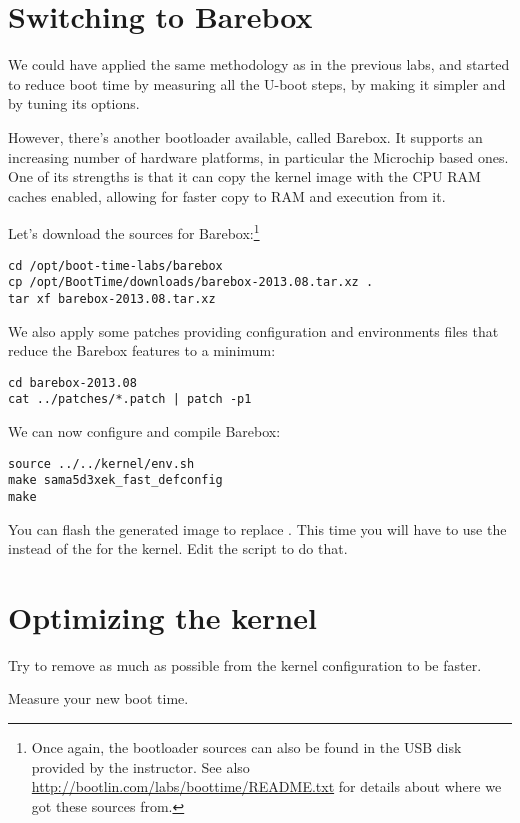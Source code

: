 
\section{Switching to Barebox}

We could have applied the same methodology as in the previous labs, and
started to reduce boot time by measuring all the U-boot steps, by making
it simpler and by tuning its options.

However, there's another bootloader available, called Barebox. It
supports an increasing number of hardware platforms, in particular the
Microchip based ones. One of its strengths is that it can copy the kernel
image with the CPU RAM caches enabled, allowing for faster copy to RAM
and execution from it.

Let's download the sources for Barebox:\footnote{Once again, the
bootloader sources can also be found in the USB disk provided by
the instructor. See also \url{http://bootlin.com/labs/boottime/README.txt}
for details about where we got these sources from.}

\begin{verbatim}
cd /opt/boot-time-labs/barebox
cp /opt/BootTime/downloads/barebox-2013.08.tar.xz .
tar xf barebox-2013.08.tar.xz
\end{verbatim}

We also apply some patches providing configuration and environments files
that reduce the Barebox features to a minimum:

\begin{verbatim}
cd barebox-2013.08
cat ../patches/*.patch | patch -p1
\end{verbatim}

We can now configure and compile Barebox:

\begin{verbatim}
source ../../kernel/env.sh
make sama5d3xek_fast_defconfig
make
\end{verbatim}

You can flash the generated image  to
replace . This time you will have to use the
 instead of the  for the kernel. Edit the
 script to do that.

\section{Optimizing the kernel}

Try to remove as much as possible from the kernel configuration to be
faster.

Measure your new boot time.
